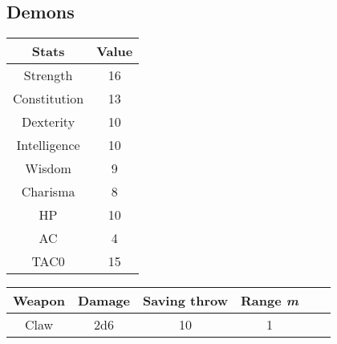 \subsection{Demons}
\begin{table}[H]
  \centering
  \begin{tabular}{|c|c|}
    \hline
    \rowcolor[HTML]{C0C0C0} 
    \textbf{Stats} & \textbf{Value} \\ \hline
    Strength & 16 \\ \hline
    Constitution & 13  \\ \hline
    Dexterity & 10 \\ \hline
    Intelligence & 10 \\ \hline
    Wisdom & 9  \\ \hline
    Charisma & 8\\ \hline
    HP & 10 \\ \hline
    AC & 4 \\ \hline
    TAC0 & 15 \\ \hline
  \end{tabular}
\end{table}
\begin{table}[H]
  \centering
  \begin{tabular}{lll|c|c|c|}
    \hline
    \rowcolor[HTML]{C0C0C0} 
    \textbf{Weapon} & \textbf{Damage} &\textbf{Saving throw}& \textbf{Range \textit{m}} \\ \hline
    \multicolumn{1}{|c|}{Claw} & \multicolumn{1}{c|}{2d6} &\multicolumn{1}{c|}{10}& \multicolumn{1}{c|}{1} \\ \hline
  \end{tabular}
\end{table}

